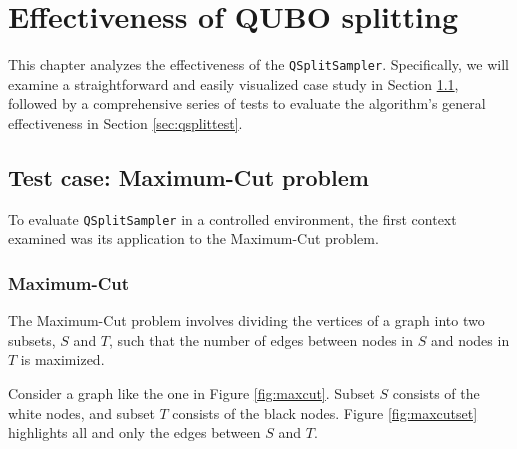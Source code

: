 \chapter{Effectiveness of QUBO splitting}\label{sec:qsplitres}

This chapter analyzes the effectiveness of the \texttt{QSplitSampler}. 
Specifically, we will examine a straightforward and easily visualized case study in Section \ref{sec:maxcut}, followed by a comprehensive series of tests to evaluate the algorithm's general effectiveness in Section \ref{sec:qsplittest}.

\section{Test case: Maximum-Cut problem}\label{sec:maxcut}

To evaluate \texttt{QSplitSampler} in a controlled environment, the first context examined was its application to the Maximum-Cut problem.

\subsection{Maximum-Cut}

The Maximum-Cut problem involves dividing the vertices of a graph into two subsets, $S$ and $T$, such that the number of edges between nodes in $S$ and nodes in $T$ is maximized.

Consider a graph like the one in Figure \ref{fig:maxcut}. 
Subset $S$ consists of the white nodes, and subset $T$ consists of the black nodes. 
Figure \ref{fig:maxcutset} highlights all and only the edges between $S$ and $T$.

